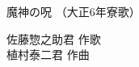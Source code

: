 \documentclass[10pt,b5j]{tarticle} %
\begin{document}
\begin{minipage}[c]{0.7\hsize} %
    \begin{center}
        {\LARGE
            魔神の呪 %
        }
        {\small 
            （大正6年寮歌） %
        }
    \end{center}
\end{minipage}
\begin{minipage}[c]{0.3\hsize} %
    \begin{flushright} %
        佐藤惣之助君 作歌\\植村泰二君 作曲 %
    \end{flushright}
\end{minipage}
\end{document}
